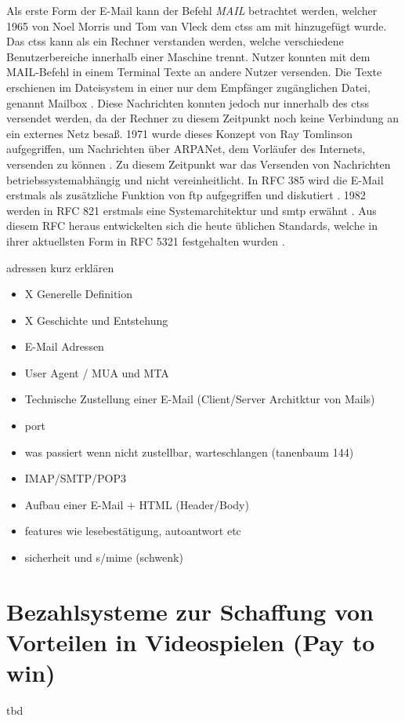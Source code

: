Als erste Form der E-Mail kann der Befehl \textit{MAIL} betrachtet werden, welcher 1965 von Noel Morris und Tom van Vleck dem \acrfull{ctss} am \acrshort{mit} hinzugefügt wurde. Das \acrshort{ctss} kann als ein Rechner verstanden werden, welche verschiedene Benutzerbereiche innerhalb einer Maschine trennt. Nutzer konnten mit dem MAIL-Befehl in einem Terminal Texte an andere Nutzer versenden. Die Texte erschienen im Dateisystem in einer nur dem Empfänger zugänglichen Datei, genannt Mailbox \citep[S. 4]{Vleck2012}. Diese Nachrichten konnten jedoch nur innerhalb des \acrshort{ctss} versendet werden, da der Rechner zu diesem Zeitpunkt noch keine Verbindung an ein externes Netz besaß. 1971 wurde dieses Konzept von Ray Tomlinson aufgegriffen, um Nachrichten über ARPANet, dem Vorläufer des Internets, versenden zu können \citep[S. 4 ff.]{Partridge2008}. Zu diesem Zeitpunkt war das Versenden von Nachrichten betriebssystemabhängig und nicht vereinheitlicht. In RFC 385 wird die E-Mail erstmals als zusätzliche Funktion von \acrshort{ftp} aufgegriffen und diskutiert \citep[S. 3 f.]{RFC385}. 1982 werden in RFC 821 erstmals eine Systemarchitektur und \acrshort{smtp} erwähnt \citep[S. 2 ff.]{RFC821}. Aus diesem RFC heraus entwickelten sich die heute üblichen Standards, welche in ihrer aktuellsten Form in RFC 5321 festgehalten wurden \citep{RFC5321}.

adressen kurz erklären


\begin{itemize}
    \item X Generelle Definition
    \item X Geschichte und Entstehung
    \item E-Mail Adressen
    \item User Agent / MUA und MTA
    \item Technische Zustellung einer E-Mail (Client/Server Architktur von Mails)
    \item port
    \item was passiert wenn nicht zustellbar, warteschlangen (tanenbaum 144)
    \item IMAP/SMTP/POP3
    \item Aufbau einer E-Mail + HTML (Header/Body)
    \item features wie lesebestätigung, autoantwort etc
    \item sicherheit und s/mime (schwenk)
\end{itemize}


\section{Bezahlsysteme zur Schaffung von Vorteilen in Videospielen (Pay to win)}

tbd